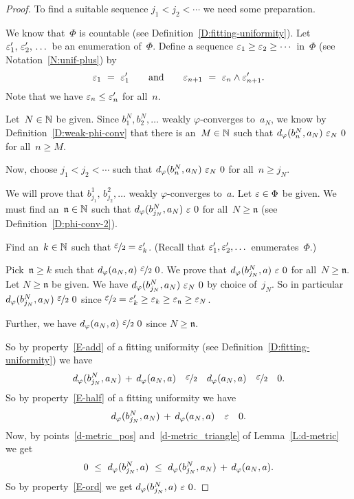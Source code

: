 \documentclass[main.tex]{subfiles}
\begin{document}
\begin{proof}
To find a suitable sequence $j_1 < j_2 <\dotsb$ we need some preparation.

We know that~$\Phi$ is countable
(see Definition~\ref{D:fitting-uniformity}).
Let $\varepsilon_1',\,\varepsilon_2',\,\dotsc$ be an enumeration of~$\Phi$.
Define a sequence $\varepsilon_1 \geq \varepsilon_2 \geq \dotsb$ in~$\Phi$
(see Notation~\ref{N:unif-plus})
by 
\begin{equation*}
\varepsilon_1 \ = \ \varepsilon_1'
\qquad\text{and}\qquad 
\varepsilon_{n+1} \ =\ \varepsilon_n \wedge \varepsilon_{n+1}'.
\end{equation*}
Note that we have $\varepsilon_n \leq \varepsilon_n'$ for all~$n$.

Let~$N\in\mathbb{N}$ be given.
Since $b^N_1,b^N_2,\dotsc$ weakly $\varphi$-converges to~$a_N$,
we know by Definition~\ref{D:weak-phi-conv} that there is an~$M\in\mathbb{N}$
such that $\ld\varphi(b^N_n, a_N)\ \ve_N\ 0$
for all~$n\geq M$.

Now,
choose $j_1<j_2<\dotsb$ such that 
$\ld\varphi(b^N_n, a_N)\ \ve_N\ 0$
for all~$n\geq j_N$.

We will prove that $b^1_{j_1},\,b^2_{j_2},\dotsc$ weakly $\varphi$-converges
to~$a$.
Let $\varepsilon\in\Phi$ be given.
We must find an~$\mathfrak{n}\in\mathbb{N}$
such that $d_{\smash{\varphi}}(b^N_{j_N},a_N) \ \varepsilon\ 0$
for all~$N\geq \mathfrak{n}$
(see Definition~\ref{D:phi-conv-2}).

Find an~$k\in\mathbb{N}$ such that $\smash{\nicefrac{\textstyle{\varepsilon}}{2}} = \varepsilon_k'$.
(Recall that $\varepsilon_1',\varepsilon_2',\dotsc$ enumerates~$\Phi$.)

Pick~$\mathfrak{n}\geq k$
such that $\ld\varphi(a_N,a) \ \dt\ve\ 0$.
We prove that $d_{\smash{\varphi}}(b_{j_N}^N,a) \ \varepsilon\ 0$
for all~$N\geq \mathfrak{n}$.
Let $N\geq\mathfrak{n}$ be given.
We have $\ld\varphi(b^N_{j_N},a_N) \ \ve_N \ 0$
by choice of~$j_N$.
So in particular $\ld\varphi(b^N_{j_N},a_N) \ \dt\ve \ 0$
since $\smash{\nicefrac{\textstyle{\varepsilon}}{2}} = \varepsilon_k'\geq\varepsilon_k \geq \varepsilon_{\mathfrak{n}} \geq \varepsilon_N$.

Further,
we have $\ld\varphi(a_N,a) \ \dt\ve\ 0$
since $N\geq \mathfrak{n}$.

So by property~\ref{E-add} 
of a fitting uniformity (see Definition~\ref{D:fitting-uniformity})
we have
\begin{equation*}
d_{\smash{\varphi}}(b_{j_N}^N,a_N) \,+\,  d_{\smash{\varphi}}(a_N,a) 
\quad\smash{\nicefrac{\textstyle{\varepsilon}}{2}}\quad 
d_{\smash{\varphi}}(a_N,a)
\quad\smash{\nicefrac{\textstyle{\varepsilon}}{2}}\quad
0.
\end{equation*}
So by property~\ref{E-half} of a fitting uniformity
we have
\begin{equation*}
d_{\smash{\varphi}}(b_{j_N}^N,a_N) \,+\,  d_{\smash{\varphi}}(a_N,a) 
\quad\varepsilon\quad 
0.
\end{equation*}
Now,
by points~\ref{d-metric_pos} and~\ref{d-metric_triangle}
of Lemma~\ref{L:d-metric}
we get
\begin{equation*}
0 \ \leq\ 
\ld\varphi(b_{j_N}^N, a) \ \leq\ 
\ld\varphi(b_{j_N}^N,a_N) \,+\,  \ld\varphi(a_N,a).
\end{equation*}
So by property~\ref{E-ord} we get $d_{\smash{\varphi}}(b^N_{j_N},a) \ \varepsilon\ 0$.
\end{proof}
\end{document}
